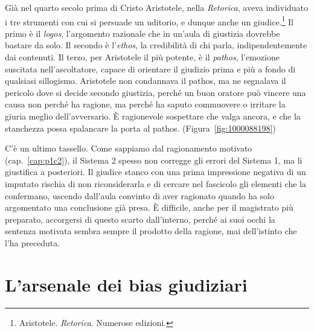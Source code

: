 Gi\`{a} nel quarto secolo prima di Cristo Aristotele, nella \textit{Retorica}, aveva individuato i tre strumenti con cui si persuade un uditorio, e dunque anche un giudice.\footnote{Aristotele. \textit{Retorica}. Numerose edizioni.} Il primo \`{e} il \textit{logos}, l'argomento razionale che in un'aula di giustizia dovrebbe bastare da solo. Il secondo \`{e} l'\textit{ethos}, la credibilit\`{a} di chi parla, indipendentemente dai contenuti. Il terzo, per Aristotele il pi\`{u} potente, \`{e} il \textit{pathos}, l'emozione suscitata nell'ascoltatore, capace di orientare il giudizio prima e pi\`{u} a fondo di qualsiasi sillogismo. Aristotele non condannava il pathos, ma ne segnalava il pericolo dove si decide secondo giustizia, perch\'{e} un buon oratore pu\`{o} vincere una causa non perch\'{e} ha ragione, ma perch\'{e} ha saputo commuovere o irritare la giuria meglio dell'avversario. \`{E} ragionevole sospettare che valga ancora, e che la stanchezza possa spalancare la porta al pathos. (Figura~\ref{fig:1000088198})

C'\`{e} un ultimo tassello. Come sappiamo dal ragionamento motivato (cap.~\ref{cap:p1c2}), il Sistema 2 spesso non corregge gli errori del Sistema 1, ma li giustifica a posteriori. Il giudice stanco con una prima impressione negativa di un imputato rischia di non riconsiderarla e di cercare nel fascicolo gli elementi che la confermano, uscendo dall'aula convinto di aver ragionato quando ha solo argomentato una conclusione gi\`{a} presa. \`{E} difficile, anche per il magistrato pi\`{u} preparato, accorgersi di questo scarto dall'interno, perch\'{e} ai suoi occhi la sentenza motivata sembra sempre il prodotto della ragione, mai dell'istinto che l'ha preceduta.

\section{L'arsenale dei bias giudiziari}

